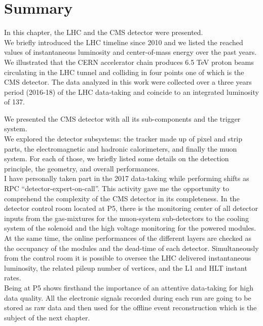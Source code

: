 \clearpage
\section{Summary}\label{sec:summaryC2}

In this chapter, the LHC and the CMS detector were presented.\\
We briefly introduced the LHC timeline since 2010 and we listed the
reached values of instantaneous luminosity and center-of-mass energy
over the past years.
We illustrated that the CERN accelerator chain produces
6.5 TeV proton beams circulating in the LHC tunnel and colliding in
four points one of which is the CMS detector. The data analyzed in
this work were collected over a three years period (2016-18) of the
LHC data-taking and coincide to an integrated luminosity of
137\fbinv.

We presented the CMS detector with all its sub-components and the
trigger system.\\
We explored the detector subsystems: the tracker made up of pixel and
strip parts, the electromagnetic
and hadronic calorimeters, and finally the muon system. For each of
those, we briefly listed some details on the detection principle,
the geometry, and overall performances. \\

I have personally taken part in the 2017 data-taking while performing
shifts as RPC ``detector-expert-on-call''. This activity gave me the
opportunity to comprehend the complexity of the CMS detector in its
completeness. In the detector control room located at P5, there is the
monitoring center of all detector inputs from the gas-mixtures
for the muon-system sub-detectors to the cooling system of the
solenoid and the high voltage monitoring for the powered
modules. At the same time, the online performances of the different layers
are checked as the occupancy of the modules and the dead-time of each
detector. Simultaneously from the control room it is possible to oversee the LHC
delivered instantaneous luminosity, the related pileup number of
vertices, and the L1 and HLT instant rates. \\
Being at P5 shows firsthand the importance of an attentive
data-taking for high data quality. All the electronic
signals recorded during each run are going to be stored as raw data
and then used for the offline event
reconstruction which is the subject of the next chapter.

